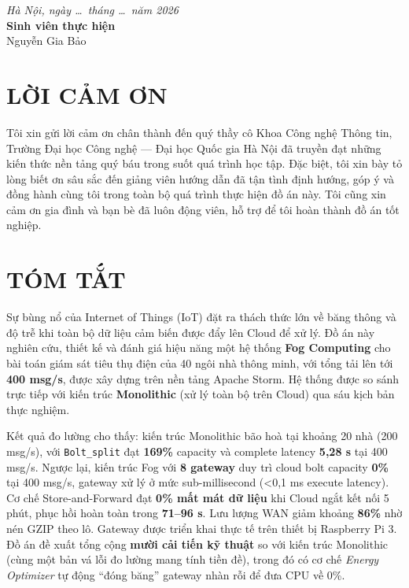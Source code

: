 \documentclass[13pt,a4paper]{report}
\newcommand{\code}[1]{\texttt{\small #1}}
\begin{document}
\vspace{2.5em}
\begin{flushright}
\textit{Hà Nội, ngày \dots\ tháng \dots\ năm 2026}\\[0.4em]
\textbf{Sinh viên thực hiện}\\[3.2em]
Nguyễn Gia Bảo
\end{flushright}

\chapter*{LỜI CẢM ƠN}
\thispagestyle{plain}
Tôi xin gửi lời cảm ơn chân thành đến quý thầy cô Khoa Công nghệ Thông tin,
Trường Đại học Công nghệ --- Đại học Quốc gia Hà Nội đã truyền đạt những
kiến thức nền tảng quý báu trong suốt quá trình học tập. Đặc biệt, tôi xin bày
tỏ lòng biết ơn sâu sắc đến giảng viên hướng dẫn đã tận tình định hướng, góp ý
và đồng hành cùng tôi trong toàn bộ quá trình thực hiện đồ án này. Tôi cũng xin
cảm ơn gia đình và bạn bè đã luôn động viên, hỗ trợ để tôi hoàn thành đồ án tốt
nghiệp.

\chapter*{TÓM TẮT}
\thispagestyle{plain}
Sự bùng nổ của Internet of Things (IoT) đặt ra thách thức lớn về băng thông và
độ trễ khi toàn bộ dữ liệu cảm biến được đẩy lên Cloud để xử lý. Đồ án này
nghiên cứu, thiết kế và đánh giá hiệu năng một hệ thống \textbf{Fog Computing}
cho bài toán giám sát tiêu thụ điện của 40 ngôi nhà thông minh, với tổng tải lên
tới \textbf{400 msg/s}, được xây dựng trên nền tảng Apache Storm. Hệ thống được
so sánh trực tiếp với kiến trúc \textbf{Monolithic} (xử lý toàn bộ trên Cloud)
qua sáu kịch bản thực nghiệm.

Kết quả đo lường cho thấy: kiến trúc Monolithic bão hoà tại khoảng 20 nhà
(200 msg/s), với \code{Bolt\_split} đạt \textbf{169\%} capacity và complete
latency \textbf{5,28 s} tại 400 msg/s. Ngược lại, kiến trúc Fog với
\textbf{8 gateway} duy trì cloud bolt capacity \textbf{0\%} tại 400 msg/s, gateway
xử lý ở mức sub-millisecond (\textless 0,1 ms execute latency). Cơ chế
Store-and-Forward đạt \textbf{0\% mất mát dữ liệu} khi Cloud ngắt kết nối 5 phút,
phục hồi hoàn toàn trong \textbf{71--96 s}. Lưu lượng WAN giảm khoảng
\textbf{86\%} nhờ nén GZIP theo lô. Gateway được triển khai thực tế trên thiết bị
Raspberry Pi 3. Đồ án đề xuất tổng cộng \textbf{mười cải tiến kỹ thuật} so với kiến
trúc Monolithic (cùng một bản vá lỗi đo lường mang tính tiền đề), trong đó có cơ
chế \textit{Energy Optimizer} tự động ``đóng băng'' gateway nhàn rỗi để đưa CPU về
0\%.
\end{document}
